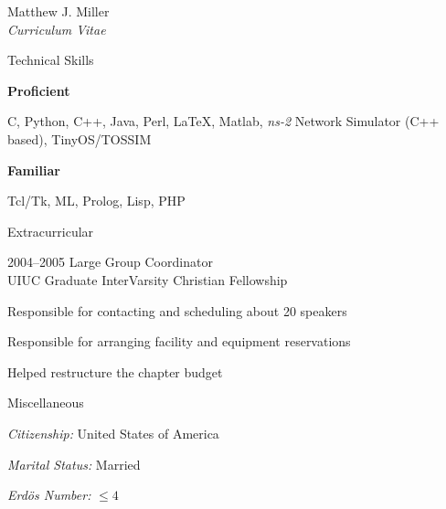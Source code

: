 \documentclass[10pt]{article}
\newenvironment{sublist}{%
    \begin{list}{}{%
        \setlength{\itemsep}{0em}\setlength{\parsep}{0em}%
        \setlength{\topsep}{0em}\setlength{\parskip}{0em}%
    }%
}%
{ \end{list} }
\newenvironment{subbulletlist}{%
    \begin{list}{\labelitemii}{%
        \setlength{\topsep}{\itemsep}\setlength{\parskip}{\parsep}%
    }%
}%
{ \end{list} }
\begin{document}
\begin{cv}{Matthew J. Miller\\{\large \itshape Curriculum Vitae}}
\setlength{\oldcvlabelwidth}{\cvlabelwidth}
\setlength{\cvlabelwidth}{1em}
\begin{cvlist}{Technical Skills}
    \item \textbf{Proficient}
    \begin{sublist}
        \item C, Python, C++, Java, Perl, LaTeX, Matlab, 
        \textit{ns-2} Network Simulator (C++ based), TinyOS/TOSSIM
    \end{sublist}
    \item \textbf{Familiar} 
    \begin{sublist}
        \item Tcl/Tk, ML, Prolog, Lisp, PHP
    \end{sublist}
\end{cvlist}
\setlength{\cvlabelwidth}{\oldcvlabelwidth}

\begin{cvlist}{Extracurricular}
    \item[2004--2005] Large Group Coordinator\\
    UIUC Graduate InterVarsity Christian Fellowship
    \begin{subbulletlist}
    \item Responsible for contacting and scheduling about 20 
    speakers 
    \item Responsible for arranging facility and equipment
    reservations
    \item Helped restructure the chapter budget
    \end{subbulletlist}
\end{cvlist}

\setlength{\oldcvlabelwidth}{\cvlabelwidth}
\setlength{\cvlabelwidth}{1em}
\begin{cvlist}{Miscellaneous}
\item \textit{Citizenship:} United States of America
\item \textit{Marital Status:} Married
\item \textit{Erd\"{o}s Number:} $\leq 4$
\end{cvlist}
\setlength{\cvlabelwidth}{\oldcvlabelwidth}


\end{cv}
\end{document}
